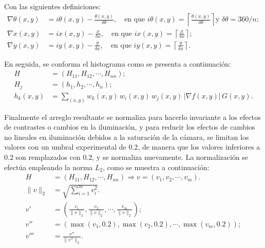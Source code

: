 %
Con las siguientes definiciones:
\begin{subequations}
    \begin{align}
        \nabla\theta(x, y) &= i\theta(x, y) - \frac{\theta(x, y)}{\delta\theta}, \quad \text{en que }
        i\theta(x, y) = \left\lceil \frac{\theta(x, y)}{\delta\theta} \right\rceil \text{y } \delta\theta = 360 / n; \\
        \nabla x(x, y) &= ix(x, y) - \frac{x}{\delta x}, \quad \text{en que } ix(x, y) = \left\lceil \frac{x}{\delta x} \right\rceil; \\
        \nabla y(x, y) &= iy(x, y) - \frac{y}{\delta x}, \quad \text{en que } iy(x, y) = \left\lceil \frac{y}{\delta x} \right\rceil.
    \end{align}
\end{subequations}

En seguida, se conforma el histograma como se presenta a continuación:
%
\begin{align}
    H &= \left(H_{11}, H_{12}, \cdots, H_{nn} \right); \nonumber \\
    H_j &= \left(h_1, h_2, \cdots, h_n\right); \nonumber \\
    h_{k}(x, y) &=
    \sum_{(x, y)} w_k(x, y)\,w_i(x, y)\,w_j(x, y)\,|\nabla f(x, y)|\,G(x, y).
\end{align}

Finalmente el arreglo resultante se normaliza para hacerlo invariante a los efectos de contrastes o cambios en la iluminación, y para reducir los efectos de cambios no lineales en iluminación debidos a la saturación de la cámara, se limitan los valores con un umbral experimental de $\num{0.2}$, de manera que los valores inferiores a $\num{0.2}$ son remplazados con $\num{0.2}$, y se normaliza nuevamente.
La normalización se efectúa empleando la norma $L_2$, como se muestra a continuación:
%
\begin{subequations}
    \begin{align*}
        H &= \left(H_{11}, H_{12}, \cdots, H_{nn}\right) \Rightarrow v = \left(v_1, v_2, \cdots, v_m\right). \\
        \|v\|_2 &= \sqrt{\sum_{i = 1}^m v_i^2}. \\
        v' &= \left(\frac{v_1}{\|v\|_2}, \frac{v_2}{\|v\|_2}, \cdots, \frac{v_m}{\|v\|_2}\right); \\
        v'' &= \left(\max\left(v_1, 0.2\right), \max\left(v_2, 0.2\right), \cdots, \max\left(v_m, 0.2\right)\right); \\
        v''' &= \frac{v''}{\|v''\|_2}.
    \end{align*}
\end{subequations}

